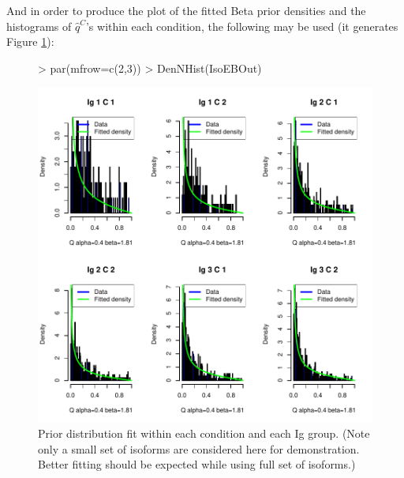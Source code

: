 \documentclass{article}
\begin{document}
\newpage
\noindent And in order to produce the plot of the fitted Beta prior densities
and the histograms of $\hat{q}^C$'s within each condition, 
the following may be used (it generates Figure \ref{fig:IsoDenNHist}):
\begin{figure}[h]
\centering
\begin{Schunk}
\begin{Sinput}
> par(mfrow=c(2,3))
> DenNHist(IsoEBOut)
\end{Sinput}
\end{Schunk}
\includegraphics{EBSeq_Vignette-035}
\caption{ Prior distribution fit within each condition and each Ig group.
(Note only a small set of isoforms are considered here for demonstration.
Better fitting should be expected while using full set of isoforms.)}
\label{fig:IsoDenNHist}
\end{figure}

\clearpage
\end{document}
